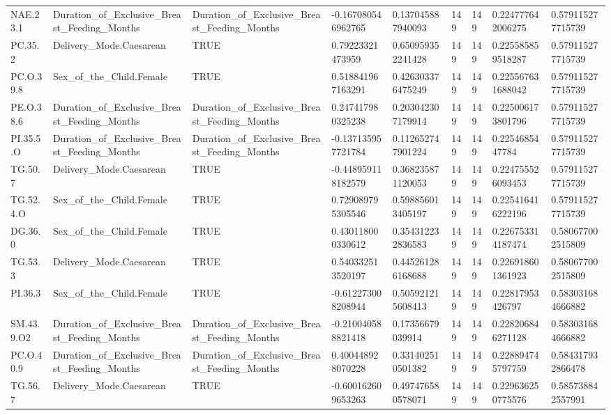 \begin{longtable}{lllllllll}
NAE.23.1 & Duration\_of\_Exclusive\_Breast\_Feeding\_Months & Duration\_of\_Exclusive\_Breast\_Feeding\_Months & -0.167080546962765 & 0.137045887940093 & 149 & 149 & 0.224777642006275 & 0.579115277715739 \\
PC.35.2 & Delivery\_Mode.Caesarean & TRUE & 0.79223321473959 & 0.650959352241428 & 149 & 149 & 0.225585859518287 & 0.579115277715739 \\
PC.O.39.8 & Sex\_of\_the\_Child.Female & TRUE & 0.518841967163291 & 0.426303376475249 & 149 & 149 & 0.225567631688042 & 0.579115277715739 \\
PE.O.38.6 & Duration\_of\_Exclusive\_Breast\_Feeding\_Months & Duration\_of\_Exclusive\_Breast\_Feeding\_Months & 0.247417980325238 & 0.203042307179914 & 149 & 149 & 0.225006173801796 & 0.579115277715739 \\
PI.35.5.O & Duration\_of\_Exclusive\_Breast\_Feeding\_Months & Duration\_of\_Exclusive\_Breast\_Feeding\_Months & -0.137135957721784 & 0.112652747901224 & 149 & 149 & 0.2254685447784 & 0.579115277715739 \\
TG.50.7 & Delivery\_Mode.Caesarean & TRUE & -0.448959118182579 & 0.368235871120053 & 149 & 149 & 0.224755526093453 & 0.579115277715739 \\
TG.52.4.O & Sex\_of\_the\_Child.Female & TRUE & 0.729089795305546 & 0.598856013405197 & 149 & 149 & 0.225416416222196 & 0.579115277715739 \\
DG.36.0 & Sex\_of\_the\_Child.Female & TRUE & 0.430118000330612 & 0.354312232836583 & 149 & 149 & 0.226753314187474 & 0.580677002515809 \\
TG.53.3 & Delivery\_Mode.Caesarean & TRUE & 0.540332513520197 & 0.445261286168688 & 149 & 149 & 0.226918601361923 & 0.580677002515809 \\
PI.36.3 & Sex\_of\_the\_Child.Female & TRUE & -0.612273008208944 & 0.505921215608413 & 149 & 149 & 0.22817953426797 & 0.583031684666882 \\
SM.43.9.O2 & Duration\_of\_Exclusive\_Breast\_Feeding\_Months & Duration\_of\_Exclusive\_Breast\_Feeding\_Months & -0.210040588821418 & 0.17356679039914 & 149 & 149 & 0.228206846271128 & 0.583031684666882 \\
PC.O.40.9 & Duration\_of\_Exclusive\_Breast\_Feeding\_Months & Duration\_of\_Exclusive\_Breast\_Feeding\_Months & 0.400448928070228 & 0.331402510501382 & 149 & 149 & 0.228894745797759 & 0.584317932866478 \\
TG.56.7 & Delivery\_Mode.Caesarean & TRUE & -0.600162609653263 & 0.497476580578071 & 149 & 149 & 0.229636250775576 & 0.585738842557991 \\

\end{longtable}
